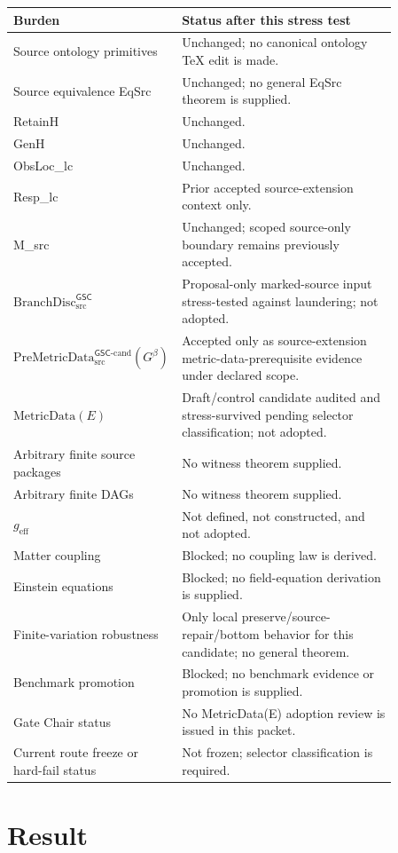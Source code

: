 \documentclass[11pt]{article}
\newcommand{\PreMetricData}{\mathrm{PreMetricData}_{\mathrm{src}}^{\mathsf{GSC}\mbox{-}\mathrm{cand}}}
\newcommand{\BranchDisc}{\mathrm{BranchDisc}_{\mathrm{src}}^{\mathsf{GSC}}}
\newcommand{\Gbeta}{G^\beta}
\newcommand{\geff}{g_{\mathrm{eff}}}
\begin{document}
\begin{longtable}{p{0.30\linewidth}p{0.56\linewidth}}
\toprule
Burden & Status after this stress test \\
\midrule
Source ontology primitives & Unchanged; no canonical ontology TeX edit is made. \\
Source equivalence EqSrc & Unchanged; no general EqSrc theorem is supplied. \\
RetainH & Unchanged. \\
GenH & Unchanged. \\
ObsLoc\_lc & Unchanged. \\
Resp\_lc & Prior accepted source-extension context only. \\
M\_src & Unchanged; scoped source-only boundary remains previously accepted. \\
\(\BranchDisc\) & Proposal-only marked-source input stress-tested against laundering; not adopted. \\
\(\PreMetricData(\Gbeta)\) & Accepted only as source-extension metric-data-prerequisite evidence under declared scope. \\
\(\mathrm{MetricData}(E)\) & Draft/control candidate audited and stress-survived pending selector classification; not adopted. \\
Arbitrary finite source packages & No witness theorem supplied. \\
Arbitrary finite DAGs & No witness theorem supplied. \\
\(\geff\) & Not defined, not constructed, and not adopted. \\
Matter coupling & Blocked; no coupling law is derived. \\
Einstein equations & Blocked; no field-equation derivation is supplied. \\
Finite-variation robustness & Only local preserve/source-repair/bottom behavior for this candidate; no general theorem. \\
Benchmark promotion & Blocked; no benchmark evidence or promotion is supplied. \\
Gate Chair status & No MetricData(E) adoption review is issued in this packet. \\
Current route freeze or hard-fail status & Not frozen; selector classification is required. \\
\bottomrule
\end{longtable}

\section{Result}
\end{document}
